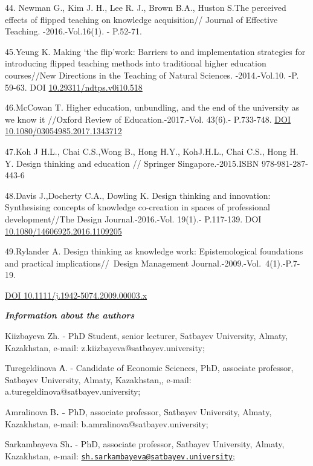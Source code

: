 44. Newman G., Kim J. H., Lee R. J., Brown B.A., Huston S.The perceived
effects of flipped teaching on knowledge acquisition// Journal of
Effective Teaching. -2016.-Vol.16(1). - P.52-71.

45.Yeung K. Making `the flip'work: Barriers to and implementation
strategies for introducing flipped teaching methods into traditional
higher education courses//New Directions in the Teaching of Natural
Sciences. -2014.-Vol.10. -P. 59-63. DOI
\href{https://doi.org/10.29311/ndtps.v0i10.518}{10.29311/ndtps.v0i10.518}

46.McCowan T. Higher education, unbundling, and the end of the
university as we know it //Oxford Review of Education.-2017.-Vol.
43(6).- P.733-748.
\href{https://doi.org/10.1080/03054985.2017.1343712}{DOI
10.1080/03054985.2017.1343712}

47.Koh J H.L., Chai C.S.,Wong B., Hong H.Y., KohJ.H.L., Chai C.S., Hong
H. Y. Design thinking and education // Springer Singapore.-2015.ISBN
978-981-287-443-6

48.Davis J.,Docherty C.A., Dowling K. Design thinking and innovation:
Synthesising concepts of knowledge co-creation in spaces of professional
development//The Design Journal.-2016.-Vol. 19(1).- P.117-139. DOI
\href{http://dx.doi.org/10.1080/14606925.2016.1109205}{10.1080/14606925.2016.1109205}

49.Rylander A. Design thinking as knowledge work: Epistemological
foundations and practical implications//~Design Management
Journal.-2009.-Vol.~4(1).-P.7-19.

\href{https://doi.org/10.1111/j.1942-5074.2009.00003.x}{DOI
10.1111/j.1942-5074.2009.00003.x}

\emph{{\bfseries Information about the authors}}

Kiizbayeva Zh. - PhD Student, senior lecturer, Satbayev University,
Almaty, Kazakhstan, e-mail: z.kiizbayeva@satbayev.university;

Turegeldinova А. - Candidate of Economic Sciences, PhD, associate
professor, Satbayev University, Almaty, Kazakhstan,, e-mail:
a.turegeldinova@satbayev.university;

Amralinova B{\bfseries . -} PhD, associate professor, Satbayev University,
Almaty, Kazakhstan, e-mail: b.amralinova@satbayev.university;

Sarkambayeva Sh{\bfseries .} - PhD, associate professor, Satbayev
University, Almaty, Kazakhstan, e-mail:
\href{mailto:sh.sarkambayeva@satbayev.university}{\nolinkurl{sh.sarkambayeva@satbayev.university}};

